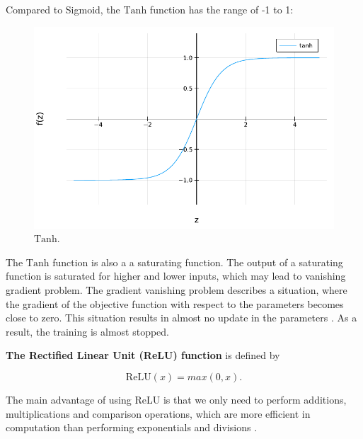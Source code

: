 \documentclass[
	parskip, 			   %
	twoside, 			   %
	DIV=14, 			   %
	BCOR=15.0mm, 		   %
	headsepline, 		   %
	open=right, 		   %
	captions=tableheading, %
	bibliography=totoc,    %
	numbers=noenddot       %
]{scrreprt}
\begin{document}
Compared to Sigmoid, the $\mathrm{Tanh}$ function has the range of -1 to 1:

\begin{figure}[h!]
    \centering
    \includegraphics[scale=0.6]{figures/tanh.pdf}
    \caption{$\mathrm{Tanh}$.}
    \label{fig:tanh}
\end{figure}

The $\mathrm{Tanh}$ function is also a a saturating function. The output of a saturating function is saturated for higher and lower inputs, which may lead to vanishing gradient problem. The gradient vanishing problem describes a situation, where the gradient of the objective function with respect to the parameters becomes close to zero. This situation results in almost no update in the parameters \cite{dubey2022activation}. As a result, the training is almost stopped.

\textbf{The Rectified Linear Unit (ReLU) function} is defined by

\begin{equation}
    \label{eq:ReLU}
    \mathrm{ReLU}(x) = max(0,x).
\end{equation}

The main advantage of using ReLU is that we only need to perform additions, multiplications and comparison operations, which are more efficient in computation than performing exponentials and divisions \cite{nwankpa2018activation}.
\end{document}
